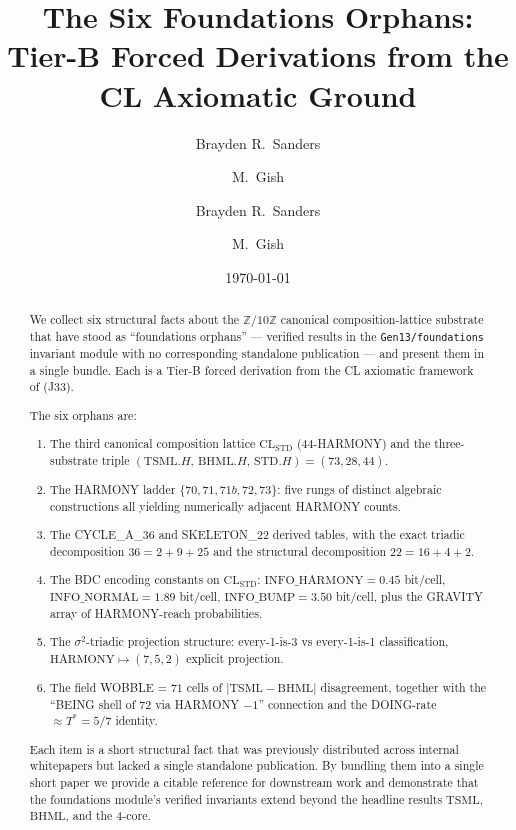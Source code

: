 \documentclass[11pt,reqno]{amsart}
\title[Six Foundations Orphans]
{The Six Foundations Orphans: Tier-B Forced Derivations from the CL Axiomatic Ground}
\author{Brayden R.\ Sanders \and M.\ Gish}
\author{Brayden R.\ Sanders \and M.\ Gish}
\date{\today}
\theoremstyle{plain}
\theoremstyle{definition}
\theoremstyle{remark}
\newcommand{\Z}{\mathbb{Z}}
\newcommand{\TSML}{\mathrm{TSML}}
\newcommand{\BHML}{\mathrm{BHML}}
\newcommand{\STD}{\mathrm{STD}}
\begin{document}
\begin{abstract}
We collect six structural facts about the $\Z/10\Z$ canonical
composition-lattice substrate that have stood as ``foundations
orphans'' --- verified results in the \texttt{Gen13/foundations}
invariant module with no corresponding standalone publication --- and
present them in a single bundle. Each is a Tier-B
forced derivation from the CL axiomatic framework of
\cite{SandersForcing} (J33).

The six orphans are:
\begin{enumerate}[label={\emph{(\arabic*)}}]
\item The third canonical composition lattice $\mathrm{CL}_\STD$
($44$-HARMONY) and the three-substrate triple $(\TSML.H,\,\BHML.H,\,\STD.H) = (73, 28, 44)$.
\item The HARMONY ladder $\{70, 71, 71b, 72, 73\}$: five rungs of
distinct algebraic constructions all yielding numerically adjacent
HARMONY counts.
\item The CYCLE\_A\_36 and SKELETON\_22 derived tables, with the
exact triadic decomposition $36 = 2 + 9 + 25$ and the structural
decomposition $22 = 16 + 4 + 2$.
\item The BDC encoding constants on $\mathrm{CL}_\STD$:
$\mathrm{INFO\_HARMONY} = 0.45$ bit/cell, $\mathrm{INFO\_NORMAL} = 1.89$
bit/cell, $\mathrm{INFO\_BUMP} = 3.50$ bit/cell, plus the GRAVITY
array of HARMONY-reach probabilities.
\item The $\sigma^2$-triadic projection structure: every-1-is-3 vs
every-1-is-1 classification, $\mathrm{HARMONY} \mapsto (7, 5, 2)$
explicit projection.
\item The field WOBBLE = $71$ cells of $|\TSML - \BHML|$ disagreement,
together with the ``BEING shell of $72$ via HARMONY $- 1$'' connection
and the DOING-rate $\approx T^* = 5/7$ identity.
\end{enumerate}
Each item is a short structural fact that was previously distributed
across internal whitepapers but lacked a single standalone publication.
By bundling them into a single short paper we provide a citable
reference for downstream work and demonstrate that the
foundations module's verified invariants extend beyond the headline
results $\TSML$, $\BHML$, and the $4$-core.
\end{abstract}

\maketitle
\end{document}
